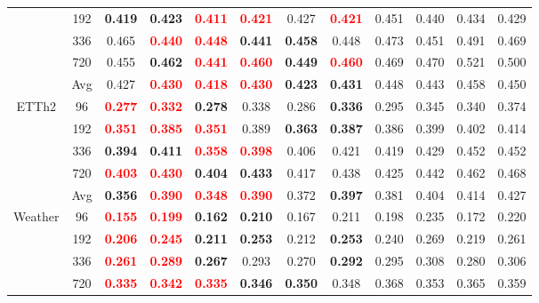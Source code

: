 \begin{table}[!htbp]
\begin{tabular}{c|c|cc|cc|cc|cc|cc}
& 192 & \textbf{0.419} & \textbf{0.423} & \textbf{\textcolor{red}{0.411}} & \textbf{\textcolor{red}{0.421}} & 0.427 & \textbf{\textcolor{red}{0.421}} & 0.451 & 0.440 & 0.434 & 0.429 \\
& 336 & 0.465 & \textbf{\textcolor{red}{0.440}} & \textbf{\textcolor{red}{0.448}} & \textbf{0.441} & \textbf{0.458} & 0.448 & 0.473 & 0.451 & 0.491 & 0.469 \\
& 720 & 0.455 & \textbf{0.462} & \textbf{\textcolor{red}{0.441}} & \textbf{\textcolor{red}{0.460}} & \textbf{0.449} & \textbf{\textcolor{red}{0.460}} & 0.469 & 0.470 & 0.521 & 0.500 \\
& Avg & 0.427 & \textbf{\textcolor{red}{0.430}} & \textbf{\textcolor{red}{0.418}} & \textbf{\textcolor{red}{0.430}} & \textbf{0.423} & \textbf{0.431} & 0.448 & 0.443 & 0.458 & 0.450 \\
\midrule
\multirow{5}{*}{ETTh2}
& 96 & \textbf{\textcolor{red}{0.277}} & \textbf{\textcolor{red}{0.332}} & \textbf{0.278} & 0.338 & 0.286 & \textbf{0.336} & 0.295 & 0.345 & 0.340 & 0.374 \\
& 192 & \textbf{\textcolor{red}{0.351}} & \textbf{\textcolor{red}{0.385}} & \textbf{\textcolor{red}{0.351}} & 0.389 & \textbf{0.363} & \textbf{0.387} & 0.386 & 0.399 & 0.402 & 0.414 \\
& 336 & \textbf{0.394} & \textbf{0.411} & \textbf{\textcolor{red}{0.358}} & \textbf{\textcolor{red}{0.398}} & 0.406 & 0.421 & 0.419 & 0.429 & 0.452 & 0.452 \\
& 720 & \textbf{\textcolor{red}{0.403}} & \textbf{\textcolor{red}{0.430}} & \textbf{0.404} & \textbf{0.433} & 0.417 & 0.438 & 0.425 & 0.442 & 0.462 & 0.468 \\
& Avg & \textbf{0.356} & \textbf{\textcolor{red}{0.390}} & \textbf{\textcolor{red}{0.348}} & \textbf{\textcolor{red}{0.390}} & 0.372 & \textbf{0.397} & 0.381 & 0.404 & 0.414 & 0.427 \\
\midrule
\multirow{5}{*}{Weather}
& 96 & \textbf{\textcolor{red}{0.155}} & \textbf{\textcolor{red}{0.199}} & \textbf{0.162} & \textbf{0.210} & 0.167 & 0.211 & 0.198 & 0.235 & 0.172 & 0.220 \\
& 192 & \textbf{\textcolor{red}{0.206}} & \textbf{\textcolor{red}{0.245}} & \textbf{0.211} & \textbf{0.253} & 0.212 & \textbf{0.253} & 0.240 & 0.269 & 0.219 & 0.261 \\
& 336 & \textbf{\textcolor{red}{0.261}} & \textbf{\textcolor{red}{0.289}} & \textbf{0.267} & 0.293 & 0.270 & \textbf{0.292} & 0.295 & 0.308 & 0.280 & 0.306 \\
& 720 & \textbf{\textcolor{red}{0.335}} & \textbf{\textcolor{red}{0.342}} & \textbf{\textcolor{red}{0.335}} & \textbf{0.346} & \textbf{0.350} & 0.348 & 0.368 & 0.353 & 0.365 & 0.359 \\

\end{tabular}
\end{table}
